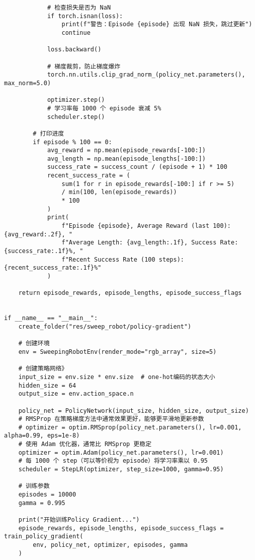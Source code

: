 \begin{verbatim}
            # 检查损失是否为 NaN
            if torch.isnan(loss):
                print(f"警告：Episode {episode} 出现 NaN 损失，跳过更新")
                continue

            loss.backward()

            # 梯度裁剪，防止梯度爆炸
            torch.nn.utils.clip_grad_norm_(policy_net.parameters(), max_norm=5.0)

            optimizer.step()
            # 学习率每 1000 个 episode 衰减 5%
            scheduler.step()

        # 打印进度
        if episode % 100 == 0:
            avg_reward = np.mean(episode_rewards[-100:])
            avg_length = np.mean(episode_lengths[-100:])
            success_rate = success_count / (episode + 1) * 100
            recent_success_rate = (
                sum(1 for r in episode_rewards[-100:] if r >= 5)
                / min(100, len(episode_rewards))
                * 100
            )
            print(
                f"Episode {episode}, Average Reward (last 100): {avg_reward:.2f}, "
                f"Average Length: {avg_length:.1f}, Success Rate: {success_rate:.1f}%, "
                f"Recent Success Rate (100 steps): {recent_success_rate:.1f}%"
            )

    return episode_rewards, episode_lengths, episode_success_flags


if __name__ == "__main__":
    create_folder("res/sweep_robot/policy-gradient")

    # 创建环境
    env = SweepingRobotEnv(render_mode="rgb_array", size=5)

    # 创建策略网络》
    input_size = env.size * env.size  # one-hot编码的状态大小
    hidden_size = 64
    output_size = env.action_space.n

    policy_net = PolicyNetwork(input_size, hidden_size, output_size)
    # RMSProp 在策略梯度方法中通常效果更好，能够更平滑地更新参数
    # optimizer = optim.RMSprop(policy_net.parameters(), lr=0.001, alpha=0.99, eps=1e-8)
    # 使用 Adam 优化器，通常比 RMSprop 更稳定
    optimizer = optim.Adam(policy_net.parameters(), lr=0.001)
    # 每 1000 个 step（可以等价视为 episode）将学习率乘以 0.95
    scheduler = StepLR(optimizer, step_size=1000, gamma=0.95)

    # 训练参数
    episodes = 10000
    gamma = 0.995

    print("开始训练Policy Gradient...")
    episode_rewards, episode_lengths, episode_success_flags = train_policy_gradient(
        env, policy_net, optimizer, episodes, gamma
    )


\end{verbatim}

